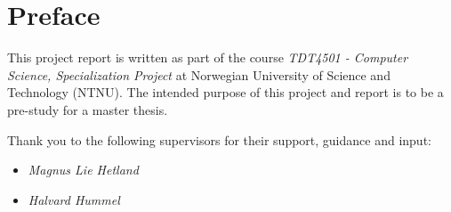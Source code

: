 \chapter{Preface}\label{chp:preface}

This project report is written as part of the course \textit{TDT4501 - Computer Science, Specialization Project} at Norwegian University of Science and Technology (NTNU). The intended purpose of this project and report is to be a pre-study for a master thesis.

Thank you to the following supervisors for their support, guidance and input:
\begin{itemize}
    \item \textit{Magnus Lie Hetland}
    \item \textit{Halvard Hummel}
\end{itemize}